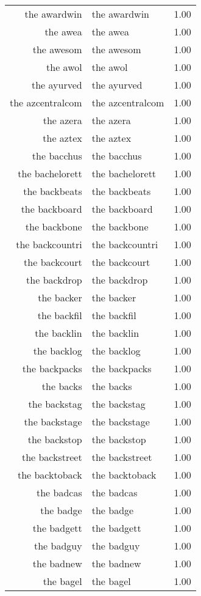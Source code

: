 \begin{table}[ht]
\begin{tabular}{rlr}
  the awardwin & the awardwin & 1.00 \\ 
  the awea & the awea & 1.00 \\ 
  the awesom & the awesom & 1.00 \\ 
  the awol & the awol & 1.00 \\ 
  the ayurved & the ayurved & 1.00 \\ 
  the azcentralcom & the azcentralcom & 1.00 \\ 
  the azera & the azera & 1.00 \\ 
  the aztex & the aztex & 1.00 \\ 
  the bacchus & the bacchus & 1.00 \\ 
  the bachelorett & the bachelorett & 1.00 \\ 
  the backbeats & the backbeats & 1.00 \\ 
  the backboard & the backboard & 1.00 \\ 
  the backbone & the backbone & 1.00 \\ 
  the backcountri & the backcountri & 1.00 \\ 
  the backcourt & the backcourt & 1.00 \\ 
  the backdrop & the backdrop & 1.00 \\ 
  the backer & the backer & 1.00 \\ 
  the backfil & the backfil & 1.00 \\ 
  the backlin & the backlin & 1.00 \\ 
  the backlog & the backlog & 1.00 \\ 
  the backpacks & the backpacks & 1.00 \\ 
  the backs & the backs & 1.00 \\ 
  the backstag & the backstag & 1.00 \\ 
  the backstage & the backstage & 1.00 \\ 
  the backstop & the backstop & 1.00 \\ 
  the backstreet & the backstreet & 1.00 \\ 
  the backtoback & the backtoback & 1.00 \\ 
  the badcas & the badcas & 1.00 \\ 
  the badge & the badge & 1.00 \\ 
  the badgett & the badgett & 1.00 \\ 
  the badguy & the badguy & 1.00 \\ 
  the badnew & the badnew & 1.00 \\ 
  the bagel & the bagel & 1.00 \\ 

\end{tabular}
\end{table}
